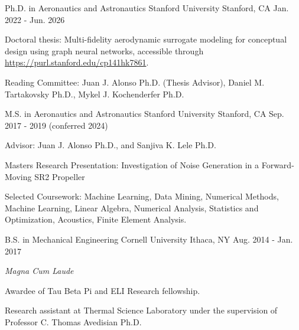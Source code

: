 

\begin{cventries}

  \cventry
    {Ph.D. in Aeronautics and Astronautics} %
    {Stanford University} %
    {Stanford, CA} %
    {Jan. 2022 - Jun. 2026} %
    {
      \begin{cvitems} %
        \item {Doctoral thesis: Multi-fidelity aerodynamic surrogate modeling for conceptual design using graph neural networks, accessible through \href{https://purl.stanford.edu/cp141hk7861}{https://purl.stanford.edu/cp141hk7861}.}
        \item {Reading Committee: Juan J. Alonso Ph.D. (Thesis Advisor), Daniel M. Tartakovsky Ph.D., Mykel J. Kochenderfer Ph.D.}
      \end{cvitems}
    }
    
  \cventry
    {M.S. in Aeronautics and Astronautics} %
    {Stanford University} %
    {Stanford, CA} %
    {Sep. 2017 - 2019 (conferred 2024)} %
    {
        \begin{cvitems}
            \item {Advisor: Juan J. Alonso Ph.D., and Sanjiva K. Lele Ph.D.}
            \item {Masters Research Presentation: Investigation of Noise Generation in a Forward-Moving SR2 Propeller}
            \item {Selected Coursework: Machine Learning, Data Mining, Numerical Methods, Machine Learning, Linear Algebra, Numerical Analysis, Statistics and Optimization, Acoustics, Finite Element Analysis.}
        \end{cvitems}
    }

  \cventry
    {B.S. in Mechanical Engineering} %
    {Cornell University} %
    {Ithaca, NY} %
    {Aug. 2014 - Jan. 2017} %
    {
      \begin{cvitems} %
        \item {\textit{Magna Cum Laude}}
        \item {Awardee of Tau Beta Pi and ELI Research fellowship.}
        \item  {Research assistant at Thermal Science Laboratory under the supervision of Professor C. Thomas Avedisian Ph.D.}
      \end{cvitems}
    }    


\end{cventries}
